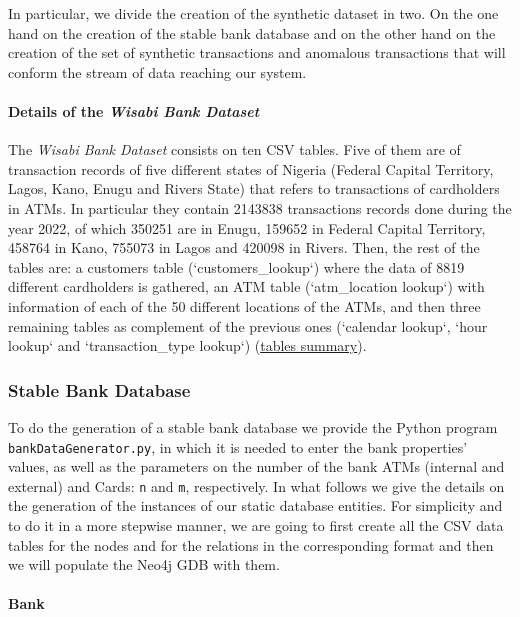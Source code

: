 \documentclass{article}
\begin{document}
In particular, we divide the creation of the synthetic dataset in two. On the one hand on the creation of the stable bank database and on the other hand on the creation of the set of synthetic transactions and anomalous transactions that will conform the stream of data reaching our system.

\paragraph{Details of the \emph{Wisabi Bank Dataset\\}}
The \emph{Wisabi Bank Dataset} consists on ten CSV tables. Five of them are of transaction records of five different states of Nigeria (Federal Capital Territory, Lagos, Kano, Enugu and Rivers State) that refers to transactions of cardholders in ATMs. In particular they contain 2143838 transactions records done during the year 2022, of which 350251 are in Enugu, 159652 in Federal Capital Territory, 458764 in Kano, 755073 in Lagos and 420098 in Rivers. Then, the rest of the tables are: a customers table (`customers\_lookup`) where the data
of 8819 different cardholders is gathered, an ATM table (`atm\_location lookup`) with
information of each of the 50 different locations of the ATMs, and then three remaining
tables as complement of the previous ones (`calendar lookup`, `hour lookup` and 
`transaction\_type lookup`) 
(\href{https://app.diagrams.net/#G1eAn47YR7-zPNE5KgStkA6_IJcxZRYgX8#%7B%22pageId%22%3A%22R2lEEEUBdFMjLlhIrx00%22%7D}{tables summary}).

\subsubsection{Stable Bank Database}

To do the generation of a stable bank database we provide the Python program \texttt{bankDataGenerator.py}, in which it is needed to enter the bank properties' values, 
as well as the parameters on the number of the bank ATMs (internal and external) and Cards: \texttt{n} and \texttt{m}, respectively. In what follows we give the details on the generation of the instances of our static database entities.
For simplicity and to do it in a more stepwise manner, we are going to first create all the CSV data tables for the nodes and for the relations in the corresponding format and then we will populate the Neo4j GDB with them.

\paragraph{Bank}
\end{document}
